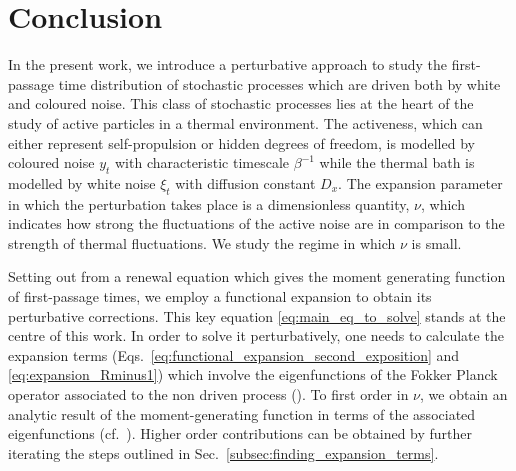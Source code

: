 \documentclass[%
 reprint,
superscriptaddress,
nofootinbib,
 amsmath,amssymb,
 aps,
prx,
]{revtex4-2}
\begin{document}
\section{\label{sec:discussion} Conclusion}

In the present work, we introduce a perturbative approach to study the first-passage time distribution of stochastic processes which are driven both by white and coloured noise. This class of stochastic processes lies at the heart of the study of active particles in a thermal environment. The activeness, which can either represent self-propulsion or hidden degrees of freedom, is modelled by coloured noise $y_t$ with characteristic timescale $\beta^{-1}$ while the thermal bath is modelled by white noise $\xi_t$ with diffusion constant $D_x$. The expansion parameter in which the perturbation takes place is a dimensionless quantity, $\nu$, which indicates how strong the fluctuations of the active noise are in comparison to the strength of thermal fluctuations. We study the regime in which $\nu$ is small.

Setting out from a renewal equation which gives the moment generating function of first-passage times, we employ a functional expansion to obtain its perturbative corrections. This key equation \eqref{eq:main_eq_to_solve}  stands at the centre of this work.  In order to solve it perturbatively, one needs to calculate the expansion terms (\cf Eqs.~\eqref{eq:functional_expansion_second_exposition} and \eqref{eq:expansion_Rminus1}) which involve the eigenfunctions of the Fokker Planck operator associated to the non driven process (\cf {}). To first order in $\nu$, we obtain an analytic result of the moment-generating function in terms of the associated eigenfunctions (cf.~). Higher order contributions can be obtained  by further iterating the steps outlined in Sec.~\ref{subsec:finding_expansion_terms}.
\end{document}
